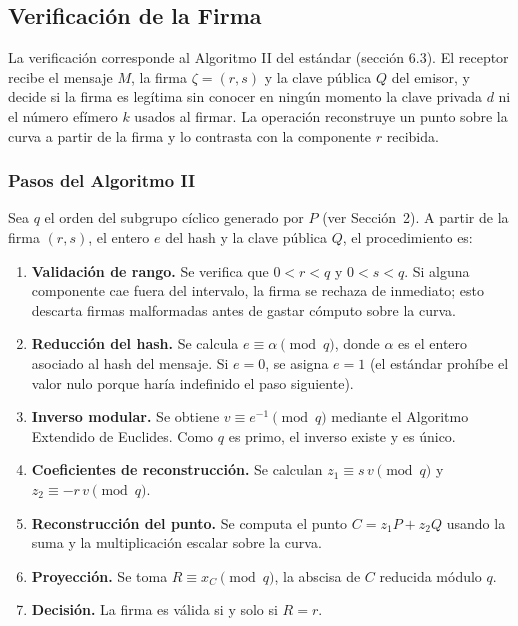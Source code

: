 \subsection{Verificación de la Firma}

La verificación corresponde al Algoritmo II del estándar (sección 6.3). El receptor recibe el mensaje $M$, la firma $\zeta = (r, s)$ y la clave pública $Q$ del emisor, y decide si la firma es legítima sin conocer en ningún momento la clave privada $d$ ni el número efímero $k$ usados al firmar. La operación reconstruye un punto sobre la curva a partir de la firma y lo contrasta con la componente $r$ recibida.

\subsubsection{Pasos del Algoritmo II}

Sea $q$ el orden del subgrupo cíclico generado por $P$ (ver Sección~2). A partir de la firma $(r,s)$, el entero $e$ del hash y la clave pública $Q$, el procedimiento es:

\begin{enumerate}
    \item \textbf{Validación de rango.} Se verifica que $0 < r < q$ y $0 < s < q$. Si alguna componente cae fuera del intervalo, la firma se rechaza de inmediato; esto descarta firmas malformadas antes de gastar cómputo sobre la curva.
    \item \textbf{Reducción del hash.} Se calcula $e \equiv \alpha \pmod q$, donde $\alpha$ es el entero asociado al hash del mensaje. Si $e = 0$, se asigna $e = 1$ (el estándar prohíbe el valor nulo porque haría indefinido el paso siguiente).
    \item \textbf{Inverso modular.} Se obtiene $v \equiv e^{-1} \pmod q$ mediante el Algoritmo Extendido de Euclides. Como $q$ es primo, el inverso existe y es único.
    \item \textbf{Coeficientes de reconstrucción.} Se calculan $z_1 \equiv s\,v \pmod q$ y $z_2 \equiv -r\,v \pmod q$.
    \item \textbf{Reconstrucción del punto.} Se computa el punto $C = z_1 P + z_2 Q$ usando la suma y la multiplicación escalar sobre la curva.
    \item \textbf{Proyección.} Se toma $R \equiv x_C \pmod q$, la abscisa de $C$ reducida módulo $q$.
    \item \textbf{Decisión.} La firma es válida si y solo si $R = r$.
\end{enumerate}


